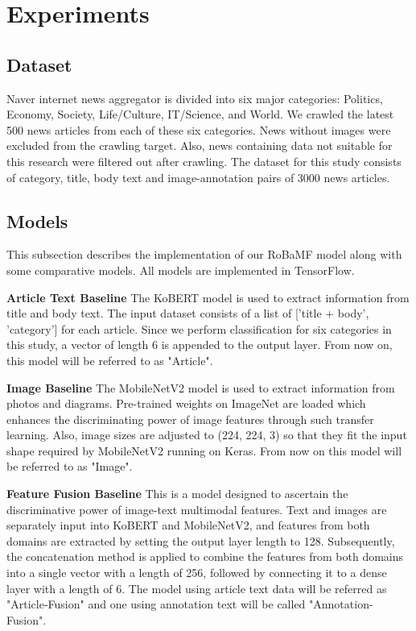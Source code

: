 \documentclass{article}
\begin{document}
\section{Experiments}
\subsection{Dataset}
Naver internet news aggregator is divided into six major categories: Politics, Economy, Society, Life/Culture, IT/Science, and World. We crawled the latest 500 news articles from each of these six categories. News without images were excluded from the crawling target. Also, news containing data not suitable for this research were filtered out after crawling. The dataset for this study consists of category, title, body text and image-annotation pairs of 3000 news articles.


\subsection{Models}
This subsection describes the implementation of our RoBaMF model along with some comparative models. All models are implemented in TensorFlow.



\textbf{Article Text Baseline}\quad
The KoBERT model is used to extract information from title and body text.
The input dataset consists of a list of ['title + body', 'category'] for each article.
Since we perform classification for six categories in this study, a vector of length 6 is appended to the output layer.
From now on, this model will be referred to as "Article".


\textbf{Image Baseline}\quad
The MobileNetV2 model is used to extract information from photos and diagrams.
Pre-trained weights on ImageNet are loaded which enhances the discriminating power of image features through such transfer learning.
Also, image sizes are adjusted to (224, 224, 3) so that they fit the input shape required by MobileNetV2 running on Keras.
From now on this model will be referred to as "Image".


\textbf{Feature Fusion Baseline}\quad
This is a model designed to ascertain the discriminative power of image-text multimodal features. Text and images are separately input into KoBERT and MobileNetV2, and features from both domains are extracted by setting the output layer length to 128. Subsequently, the concatenation method is applied to combine the features from both domains into a single vector with a length of 256, followed by connecting it to a dense layer with a length of 6.
The model using article text data will be referred as "Article-Fusion" and one using annotation text will be called "Annotation-Fusion".
\end{document}
